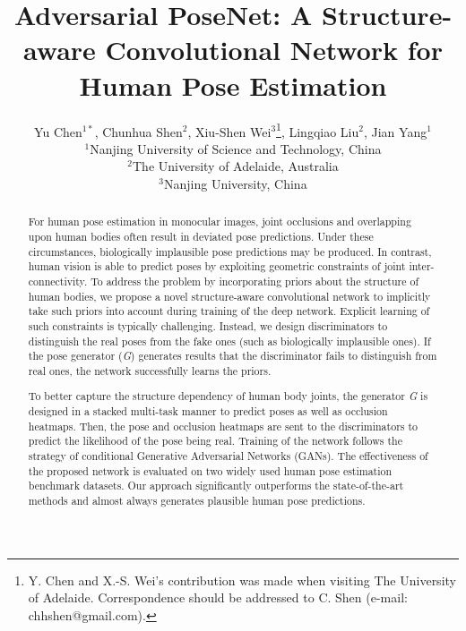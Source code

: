 \documentclass[10pt,letterpaper,twocolumn]{article}
\begin{document}
\title{
  Adversarial PoseNet:
  A Structure-aware Convolutional Network for Human Pose Estimation
}



\author{
  Yu Chen$^{1*}$, Chunhua Shen$^2$, Xiu-Shen Wei$^{3}$\thanks{Y. Chen and X.-S. Wei's 
  contribution was made when visiting The University of Adelaide. Correspondence should be addressed to C. Shen
  (e-mail: chhshen@gmail.com).  
   },
   Lingqiao Liu$^2$, Jian Yang$^1$\\ 
  $^1$Nanjing University of Science and Technology, China\\
  $^2$The University of Adelaide, Australia\\
  $^3$Nanjing University, China
}




\maketitle
\begin{abstract}
For human pose estimation in monocular images, 
joint occlusions and overlapping upon human bodies often result in deviated 
pose predictions. Under these circumstances, biologically implausible pose predictions may be produced. In contrast, human vision is able to predict poses by exploiting geometric constraints of joint inter-connectivity. To address the problem by incorporating priors about the structure of human bodies, we propose a novel structure-aware convolutional network to implicitly take such priors into account during training of the deep network. Explicit learning of such constraints is typically challenging. Instead, we design discriminators to distinguish the real poses from the fake ones (such as biologically implausible ones). If the pose generator (\textit{G}) generates results that the discriminator fails to distinguish from real ones, the network successfully learns the priors.

To better capture the structure dependency of human body joints, the generator \textit{G} is designed in a stacked multi-task manner to predict poses as well as occlusion heatmaps. Then, the pose and occlusion heatmaps are sent to the discriminators to predict the likelihood of the pose being real. Training of the  network follows the strategy of conditional Generative Adversarial Networks (GANs). The effectiveness of the proposed network is evaluated on two widely used human pose estimation benchmark datasets. Our approach significantly outperforms the state-of-the-art methods and almost always generates plausible human pose predictions.
\end{abstract}
\end{document}
